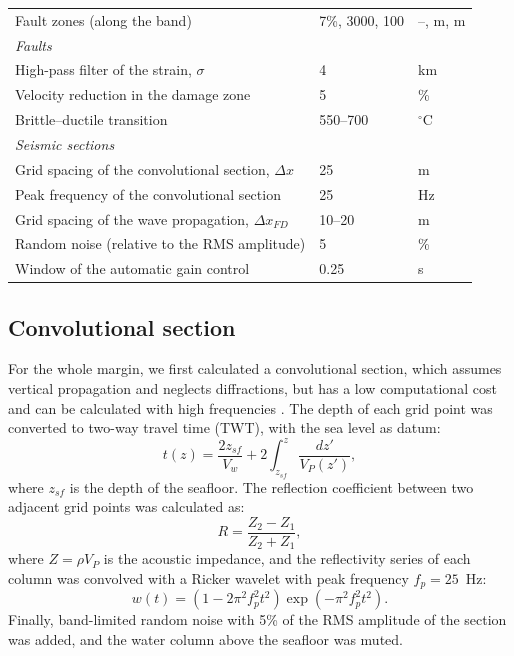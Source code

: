 \begin{table}[ht]
\begin{tabular}{lll}
    \quad Fault zones (along the band) & 7\%, 3000, 100 & --, m, m \\
    \multicolumn{3}{l}{\textit{Faults}} \\
    \quad High-pass filter of the strain, $\sigma$ & 4 & km \\
    \quad Velocity reduction in the damage zone & 5 & \% \\
    \quad Brittle--ductile transition & 550--700 & $^\circ$C \\
    \multicolumn{3}{l}{\textit{Seismic sections}} \\
    \quad Grid spacing of the convolutional section, $\Delta x$ & 25 & m \\
    \quad Peak frequency of the convolutional section & 25 & Hz \\
    \quad Grid spacing of the wave propagation, $\Delta x_{FD}$ & 10--20 & m \\
    \quad Random noise (relative to the RMS amplitude) & 5 & \% \\
    \quad Window of the automatic gain control & 0.25 & s \\
    \bottomrule
  \end{tabular}
\end{table}

\subsection{Convolutional section}
\label{sec:seismic_convolutional}

For the whole margin, we first calculated a convolutional section, which assumes vertical
propagation and neglects diffractions, but has a low computational cost and can be calculated
with high frequencies \citep{Yilmaz2001}. The depth of each grid point was converted to
two-way travel time (TWT), with the sea level as datum:
\begin{equation}
  t(z) = \frac{2 z_{sf}}{V_w} + 2 \int_{z_{sf}}^{z} \frac{dz'}{V_P(z')},
  \label{eq:twt}
\end{equation}
where $z_{sf}$ is the depth of the seafloor. The reflection coefficient between two adjacent
grid points was calculated as:
\begin{equation}
  R = \frac{Z_2 - Z_1}{Z_2 + Z_1},
  \label{eq:reflectivity}
\end{equation}
where $Z = \rho V_P$ is the acoustic impedance, and the reflectivity series of each column
was convolved with a Ricker wavelet \citep{Ricker1953} with peak frequency $f_p = 25$~Hz:
\begin{equation}
  w(t) = \left(1 - 2 \pi^2 f_p^2 t^2\right) \exp\left(-\pi^2 f_p^2 t^2\right).
  \label{eq:ricker}
\end{equation}
Finally, band-limited random noise with 5\% of the RMS amplitude of the section was added,
and the water column above the seafloor was muted.

